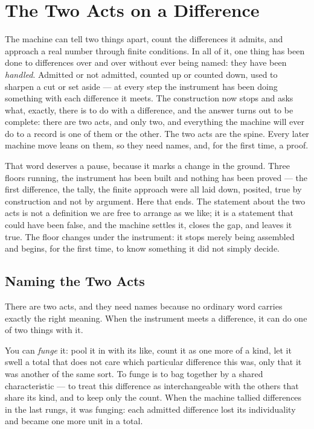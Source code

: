 \chapter{The Two Acts on a Difference}

The machine can tell two things apart, count the differences it admits, and approach a real number through finite
conditions. In all of it, one thing has been done to differences over and over without ever being named: they have
been \emph{handled}. Admitted or not admitted, counted up or counted down, used to sharpen a cut or set aside ---
at every step the instrument has been doing something with each difference it meets. The construction now stops
and asks what, exactly, there is to do with a difference, and the answer turns out to be complete: there are two
acts, and only two, and everything the machine will ever do to a record is one of them or the other. The two acts
are the spine. Every later machine move leans on them, so they need names, and, for the first time, a proof.

That word deserves a pause, because it marks a change in the ground. Three floors running, the instrument has
been built and nothing has been proved --- the first difference, the tally, the finite approach were all laid
down, posited, true by construction and not by argument. Here that ends. The statement about the two acts is not
a definition we are free to arrange as we like; it is a statement that could have been false, and the machine
settles it, closes the gap, and leaves it true. The floor changes under the instrument: it stops merely being
assembled and begins, for the first time, to know something it did not simply decide.

\section{Naming the Two Acts}

There are two acts, and they need names because no ordinary word carries exactly the right meaning. When the
instrument meets a difference, it can do one of two things with it.

You can \emph{funge} it: pool it in with its like, count it as one more of a kind, let it swell a total that does
not care which particular difference this was, only that it was another of the same sort. To funge is to bag
together by a shared characteristic --- to treat this difference as interchangeable with the others that share
its kind, and to keep only the count. When the machine tallied differences in the last rungs, it was funging:
each admitted difference lost its individuality and became one more unit in a total.

